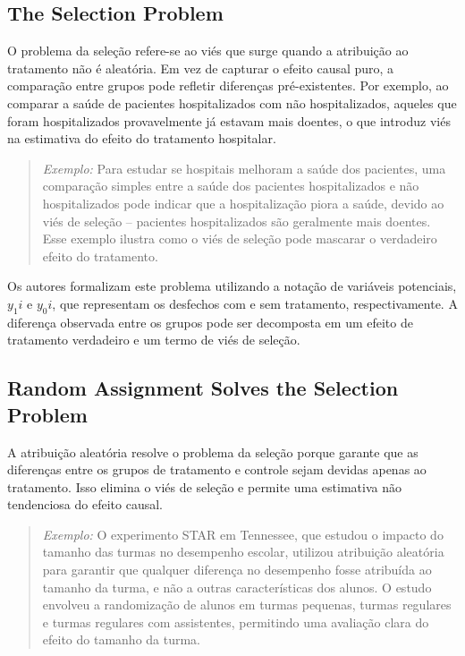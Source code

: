 \documentclass[a4paper,12pt]{article}[abntex2]
\begin{document}
\subsection{The Selection Problem}
O problema da seleção refere-se ao viés que surge quando a atribuição ao tratamento não é aleatória. Em vez de capturar o efeito causal puro, a comparação entre grupos pode refletir diferenças pré-existentes. Por exemplo, ao comparar a saúde de pacientes hospitalizados com não hospitalizados, aqueles que foram hospitalizados provavelmente já estavam mais doentes, o que introduz viés na estimativa do efeito do tratamento hospitalar.

\begin{quote}
\textit{Exemplo:} Para estudar se hospitais melhoram a saúde dos pacientes, uma comparação simples entre a saúde dos pacientes hospitalizados e não hospitalizados pode indicar que a hospitalização piora a saúde, devido ao viés de seleção – pacientes hospitalizados são geralmente mais doentes. Esse exemplo ilustra como o viés de seleção pode mascarar o verdadeiro efeito do tratamento.
\end{quote}

Os autores formalizam este problema utilizando a notação de variáveis potenciais, \( y_1i \) e \( y_0i \), que representam os desfechos com e sem tratamento, respectivamente. A diferença observada entre os grupos pode ser decomposta em um efeito de tratamento verdadeiro e um termo de viés de seleção.

\subsection{Random Assignment Solves the Selection Problem}
A atribuição aleatória resolve o problema da seleção porque garante que as diferenças entre os grupos de tratamento e controle sejam devidas apenas ao tratamento. Isso elimina o viés de seleção e permite uma estimativa não tendenciosa do efeito causal.

\begin{quote}
\textit{Exemplo:} O experimento STAR em Tennessee, que estudou o impacto do tamanho das turmas no desempenho escolar, utilizou atribuição aleatória para garantir que qualquer diferença no desempenho fosse atribuída ao tamanho da turma, e não a outras características dos alunos. O estudo envolveu a randomização de alunos em turmas pequenas, turmas regulares e turmas regulares com assistentes, permitindo uma avaliação clara do efeito do tamanho da turma.
\end{quote}
\end{document}
